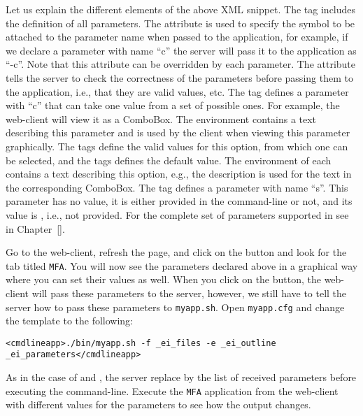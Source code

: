 \medskip
\noindent
Let us explain the different elements of the above XML snippet. 
%
The tag  includes the definition of all
parameters. The attribute  is used to specify the symbol
to be attached to the parameter name when passed to the application,
for example, if we declare a parameter with name ``c'' the server will
pass it to the application as ``-c''. Note that this attribute can be
overridden by each parameter.
%
The attribute  tells the server to check the correctness of
the parameters before passing them to the application, i.e., that they
are valid values, etc.
%
The tag  defines a parameter with  ``c'' that
can take one value from a set of possible ones. For example, the
web-client will view it as a ComboBox.
%
The  environment contains a text describing this parameter
and is used by the client when viewing this parameter graphically.
%
The  tags define the valid values for this option, from
which one can be selected, and the  tags defines the
default value.  The  environment of each 
contains a text describing this option, e.g., the 
description is used for the text in the corresponding ComboBox.
%
The tag  defines a parameter with name ``s''. This parameter
has no value, it is either provided in the command-line or not, and
its  value is , i.e., not provided. For the
complete set of parameters supported in \ei see
 in Chapter~\ref{}.

Go to the web-client, refresh the page, and click on the
\settingbutton button and look for the tab titled \texttt{MFA}.  You
will now see the parameters declared above in a graphical way where
you can set their values as well.  When you click on the \applybutton
button, the web-client will pass these parameters to the server,
however, we still have to tell the server how to pass these parameters
to \texttt{myapp.sh}. Open \texttt{myapp.cfg} and change the
 template to the following:

\medskip
\begin{lstlisting}
<cmdlineapp>./bin/myapp.sh -f _ei_files -e _ei_outline _ei_parameters</cmdlineapp>
\end{lstlisting}

\medskip
\noindent
As in the case of  and , the server
replace  by the list of received parameters before
executing the command-line. Execute the \texttt{MFA} application from
the web-client with different values for the parameters to see how the
output changes.

